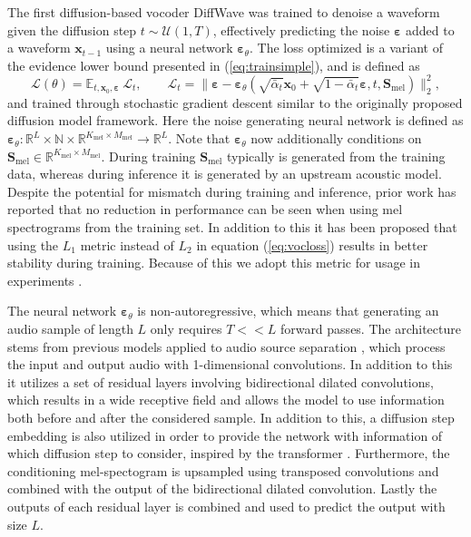 \documentclass{report}
\begin{document}
The first diffusion-based vocoder DiffWave \cite{kong2020diffwave} was trained to denoise a waveform given the diffusion step $t \sim \mathcal{U}(1, T)$, effectively predicting the noise $\bm{\varepsilon}$ added to a waveform $\bm{x}_{t-1}$ using a neural network $\bm{\varepsilon}_{\theta}$. The loss optimized is a variant of the evidence lower bound presented in (\ref{eq:trainsimple}), and is defined as
\begin{equation} \label{eq:vocloss}
    \mathcal{L}(\theta) = \mathbb{E}_{t, \bm{x}_0, \bm{\varepsilon}} \ \mathcal{L}_{t}, \qquad \mathcal{L}_{t} = \| \bm{\varepsilon} - \bm{\varepsilon}_{\theta}(\sqrt{\bar{\alpha}_t} \bm{x}_0 + \sqrt{1 - \bar{\alpha}_t}\bm{\varepsilon}, t, \bm{S}_{\text{mel}}) \|_2^2,
\end{equation}
and trained through stochastic gradient descent similar to the originally proposed diffusion model framework. Here the noise generating neural network is defined as $\bm{\varepsilon}_{\theta}: \mathbb{R}^L \times \mathbb{N} \times \mathbb{R}^{K_{\text{mel}} \times M_{\text{mel}}} \rightarrow \mathbb{R}^L$. Note that $\bm{\varepsilon}_{\theta}$ now additionally conditions on $\bm{S}_{\text{mel}} \in \mathbb{R}^{K_{\text{mel}} \times M_{\text{mel}}}$. During training $\bm{S}_{\text{mel}}$ typically is generated from the training data, whereas during inference it is generated by an upstream acoustic model. Despite the potential for mismatch during training and inference, prior work has reported that no reduction in performance can be seen when using mel spectrograms from the training set. In addition to this it has been proposed that using the $L_1$ metric instead of $L_2$ in equation (\ref{eq:vocloss}) results in better stability during training. Because of this we adopt this metric for usage in experiments \cite{chen2020wavegrad}.

The neural network $\bm{\varepsilon}_{\theta}$ is non-autoregressive, which means that generating an audio sample of length $L$ only requires $T << L$ forward passes. The architecture stems from previous models applied to audio source separation \cite{rethage2018wavenet}, which process the input and output audio with 1-dimensional convolutions. In addition to this it utilizes a set of residual layers involving bidirectional dilated convolutions, which results in a wide receptive field and allows the model to use information both before and after the considered sample. In addition to this, a diffusion step embedding is also utilized in order to provide the network with information of which diffusion step to consider, inspired by the transformer \cite{vaswani2017attention}. Furthermore, the conditioning mel-spectogram is upsampled using transposed convolutions and combined with the output of the bidirectional dilated convolution. Lastly the outputs of each residual layer is combined and used to predict the output with size $L$.
\end{document}
